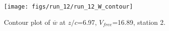 \begin{figure}[H]
\centering
\texttt{[image: figs/run\_12/run\_12\_W\_contour]}
\caption{Contour plot of $\overline{w}$ at $z/c$=6.97, $V_{free}$=16.89, station 2.}
\label{fig:run_12_W_contour}
\end{figure}


